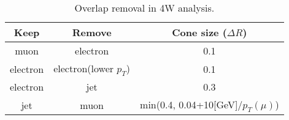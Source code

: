   \begin{table}
  \centering
  \small
  \begin{tabular}{|c|c|c|}
  \hline
               Keep        &Remove            &Cone size ($\Delta R$) \\
  \hline
               muon    &electron   &0.1 \\
  \hline
               electron     &electron(lower $p_T$)          &0.1 \\
  \hline
               electron    &jet               &0.3      \\
  \hline
               jet        &muon               &min(0.4, 0.04+10[GeV]/$p_T(\mu)$) \\
  \hline
  \end{tabular}
  \caption{Overlap removal in 4W analysis.}
  \label{tab:4w_olr}
  \end{table}
